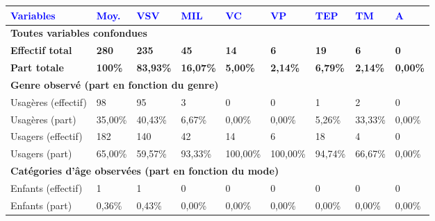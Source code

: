         \begin{longtable}{p{3.7cm}p{0.9cm}p{0.9cm}p{0.9cm}p{0.9cm}p{0.9cm}p{0.9cm}p{0.9cm}p{0.9cm}}
         \textcolor{blue}{\textbf{Variables}} & \textcolor{blue}{\textbf{Moy.}} & \textcolor{blue}{\textbf{VSV}} & \textcolor{blue}{\textbf{MIL}} & \textcolor{blue}{\textbf{VC}} & \textcolor{blue}{\textbf{VP}} & \textcolor{blue}{\textbf{TEP}} & \textcolor{blue}{\textbf{TM}} & \textcolor{blue}{\textbf{A}}\\
        \hline
        \endhead      
\multicolumn{9}{l}{\textbf{Toutes variables confondues}}\\
    \small{\textbf{Effectif total}} & \small{\textbf{280}} & \small{\textbf{235}} & \small{\textbf{45}} & \small{\textbf{14}} & \small{\textbf{6}} & \small{\textbf{19}} & \small{\textbf{6}} & \small{\textbf{0}}\\   
    \small{\textbf{Part totale}} & \small{\textbf{100\%}} & \small{\textbf{83,93\%}} & \small{\textbf{16,07\%}} & \small{\textbf{5,00\%}} & \small{\textbf{2,14\%}} & \small{\textbf{6,79\%}} & \small{\textbf{2,14\%}} & \small{\textbf{0,00\%}}\\
    \hline    
\multicolumn{9}{l}{\textbf{Genre observé (part en fonction du genre)}}\\
    \small{Usagères (effectif)} & \small{98} & \small{95} & \small{3} & \small{0} & \small{0} & \small{1} & \small{2} & \small{0}\\   
    \small{Usagères (part)} & \small{35,00\%} & \small{40,43\%} & \small{6,67\%} & \small{0,00\%} & \small{0,00\%} & \small{5,26\%} & \small{33,33\%} & \small{0,00\%}\\    
    \small{Usagers (effectif)} & \small{182} & \small{140} & \small{42} & \small{14} & \small{6} & \small{18} & \small{4} & \small{0}\\    
    \small{Usagers (part)} & \small{65,00\%} & \small{59,57\%} & \small{93,33\%} & \small{100,00\%} & \small{100,00\%} & \small{94,74\%} & \small{66,67\%} & \small{0,00\%}\\
    \hline    
\multicolumn{9}{l}{\textbf{Catégories d'âge observées (part en fonction du mode)}}\\
    \small{Enfants (effectif)} & \small{1} & \small{1} & \small{0} & \small{0} & \small{0} & \small{0} & \small{0} & \small{0}\\    
    \small{Enfants (part)} & \small{0,36\%} & \small{0,43\%} & \small{0,00\%} & \small{0,00\%} & \small{0,00\%} & \small{0,00\%} & \small{0,00\%} & \small{0,00\%}\\    

\end{longtable}
